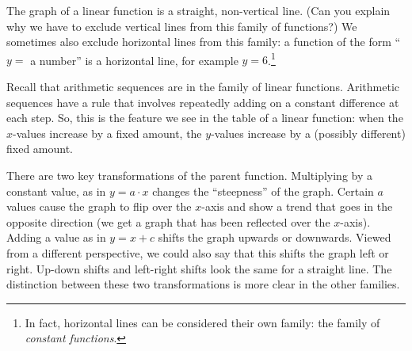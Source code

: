 The graph of a linear function is a straight, non-vertical line. (Can you explain why we have to exclude vertical lines from this family of functions?) We sometimes also exclude horizontal lines from this family: a function of the form ``$y=$ a number'' is a horizontal line, for example $y = 6$.\footnote{In fact, horizontal lines can be considered their own family: the family of \textit{constant functions}.}

Recall that arithmetic sequences are in the family of linear functions. Arithmetic sequences have a rule that involves repeatedly adding on a constant difference at each step. So, this is the feature we see in the table of a linear function: when the $x$-values increase by a fixed amount, the $y$-values increase by a (possibly different) fixed amount.

There are two key transformations of the parent function. Multiplying by a constant value, as in $y=a \cdot x$ changes the ``steepness'' of the graph. Certain $a$ values cause the graph to flip over the $x$-axis and show a trend that goes in the opposite direction (we get a graph that has been reflected over the $x$-axis). Adding a value as in $y=x + c$ shifts the graph upwards or downwards. Viewed from a different perspective, we could also say that this shifts the graph left or right. Up-down shifts and left-right shifts look the same for a straight line. The distinction between these two transformations is more clear in the other families.


